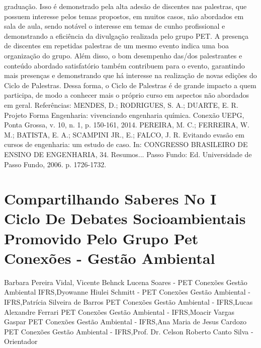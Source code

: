 graduação. Isso é demonstrado pela alta adesão de discentes nas palestras, que possuem interesse 
pelos temas propostos, em muitos casos, não abordados em sala de aula, sendo notável o interesse 
em temas de cunho profissional e demonstrando a eficiência da divulgação realizada pelo grupo 
PET.
A presença de discentes em repetidas palestras de um mesmo evento indica uma boa 
organização do grupo. Além disso, o bom desempenho das/dos palestrantes e conteúdo abordado 
satisfatório também contribuem para o evento, garantindo mais presenças e demonstrando que há 
interesse na realização de novas edições do Ciclo de Palestras.
Dessa forma, o Ciclo de Palestras é de grande impacto a quem participa, de modo a 
conhecer mais o próprio curso em aspectos não abordados em geral.
Referências:
MENDES, D.; RODRIGUES, S. A.; DUARTE, E. R. Projeto Forma Engenharia: vivenciando 
engenharia química. Conexão UEPG, Ponta Grossa, v. 10, n. 1, p. 150-161, 2014.
PEREIRA, M. C.; FERREIRA, W. M.; BATISTA, E. A.; SCAMPINI JR., E.; FALCO, J. R. 
Evitando evasão em cursos de engenharia: um estudo de caso. In: CONGRESSO BRASILEIRO 
DE ENSINO DE ENGENHARIA, 34. Resumos... Passo Fundo: Ed. Universidade de Passo 
Fundo, 2006. p. 1726-1732.




\section*{Compartilhando Saberes No I Ciclo De Debates Socioambientais Promovido Pelo Grupo Pet Conexões - Gestão Ambiental}

Barbara Pereira Vidal, Vicente Behnck Lucena Soares - PET Conexões Gestão Ambiental IFRS,Dyowanne Hiulei Schmitt - PET Conexões Gestão Ambiental - IFRS,Patrícia Silveira de Barros PET Conexões Gestão Ambiental - IFRS,Lucas Alexandre Ferrari PET Conexões Gestão Ambiental - IFRS,Moacir Vargas Gaspar PET Conexões Gestão Ambiental - IFRS,Ana Maria de Jesus Cardozo PET Conexões Gestão Ambiental - IFRS,Prof. Dr. Celson Roberto Canto Silva - Orientador

